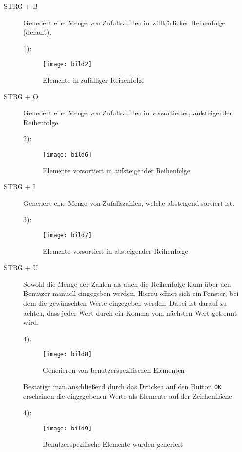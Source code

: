 \begin{description}
\item[STRG + B] Generiert eine Menge von Zufallszahlen in willkürlicher Reihenfolge (default).

\ref{figure:zufall}):

\begin{figure}[!htb]
    \centering
      \texttt{[image: bild2]}
    \caption{Elemente in zufälliger Reihenfolge}
    \label{figure:zufall}
\end{figure}

\item[STRG + O] Generiert eine Menge von Zufallszahlen in vorsortierter, aufsteigender Reihenfolge.

\ref{figure:vorsortiert}):

\begin{figure}[!htb]
    \centering
      \texttt{[image: bild6]}
    \caption{Elemente vorsortiert in aufsteigender Reihenfolge}
    \label{figure:vorsortiert}
\end{figure}

\item[STRG + I] Generiert eine Menge von Zufallszahlen, welche absteigend sortiert ist.

\ref{figure:inverse}):

\begin{figure}[!htb]
    \centering
      \texttt{[image: bild7]}
    \caption{Elemente vorsortiert in absteigender Reihenfolge}
    \label{figure:inverse}
\end{figure}

\item[STRG + U] Sowohl die Menge der Zahlen als auch die Reihenfolge kann über den Benutzer manuell eingegeben werden. Hierzu öffnet sich ein Fenster, bei dem die gewünschten Werte eingegeben werden. Dabei ist darauf zu achten, dass jeder Wert durch ein Komma vom nächsten Wert getrennt wird.

\ref{figure:benutzer}):

\begin{figure}[!htb]
    \centering
      \texttt{[image: bild8]}
    \caption{Generieren von benutzerspezifischen Elementen}
    \label{figure:benutzer}
\end{figure}

Bestätigt man anschließend durch das Drücken auf den Button \texttt{OK}, erscheinen die eingegebenen Werte als Elemente auf der Zeichenfläche


\ref{figure:benutzer}):

\begin{figure}[!htb]
    \centering
      \texttt{[image: bild9]}
    \caption{Benutzerspezifische Elemente wurden generiert}
    \label{figure:benutzer2}
\end{figure}
\end{description}





